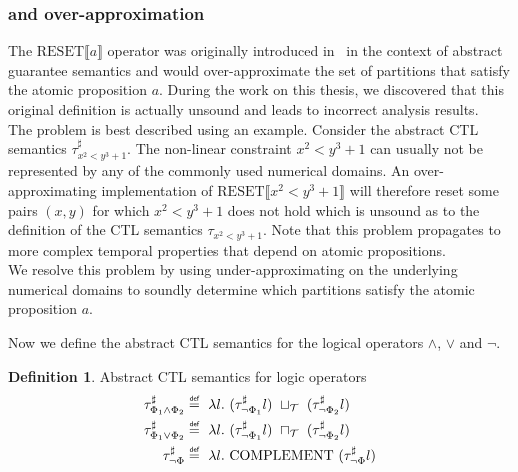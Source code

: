 \documentclass[11pt,a4paper,titlepage]{article}
\theoremstyle{definition}
\newtheorem{definition}{Definition}[section]
\newcommand\eqdef{\mathrel{\overset{\makebox[0pt]{\mbox{\normalfont\tiny\sffamily def}}}{=}}}
\begin{document}
\begin{tcolorbox}
    \subsubsection*{ and over-approximation}

    The $\text{RESET}\llbracket a \rrbracket$ operator was originally introduced in~\cite{UrbanPhd} in the context of abstract guarantee semantics
    and would over-approximate the set of partitions that satisfy the atomic proposition $a$. 
    During the work on this thesis, we discovered that this original definition is actually unsound and leads to incorrect analysis results.\\
    
    The problem is best described using an example. Consider the abstract CTL semantics $\tau^{\sharp}_{x^2 < y^3 + 1}$. 
    The non-linear constraint $x^2 < y^3 + 1$ can usually not be represented by any of the commonly used numerical domains. 
    An over-approximating implementation of $\text{RESET}\llbracket x^2 < y^3 + 1 \rrbracket$ will therefore
    reset some pairs $(x, y)$ for which $x^2 < y^3 + 1$ does not hold which is unsound as to the definition of
    the CTL semantics $\tau_{x^2 < y^3 + 1}$. Note that this problem propagates to more complex temporal properties that
    depend on atomic propositions.\\

    We resolve this problem by using under-approximating on the underlying numerical domains to soundly determine which partitions 
    satisfy the atomic proposition $a$. 
\end{tcolorbox}

Now we define the abstract CTL semantics for the logical operators $\land$, $\lor$ and $\neg$.

\begin{definition}\label{def:abstract_ctl_semantics_logic_operators}
    Abstract CTL semantics for logic operators
    \begin{align}
        \tau^{\sharp}_{\Phi_1 \land \Phi_2} &\eqdef \ \lambda l. \ (\tau^{\sharp}_{\neg \Phi_1}l) \ \sqcup_{\mathcal{T}} \ (\tau^{\sharp}_{\neg \Phi_2}l)
        \label{eq:abstract_ctl_and}\\
        \tau^{\sharp}_{\Phi_1 \lor \Phi_2} &\eqdef \ \lambda l. \ (\tau^{\sharp}_{\neg \Phi_1}l) \ \sqcap_{\mathcal{T}} \ (\tau^{\sharp}_{\neg \Phi_2}l)
        \label{eq:abstract_ctl_or}\\
        \tau^{\sharp}_{\neg \Phi} &\eqdef \ \lambda l. \ \text{COMPLEMENT} \ (\tau^{\sharp}_{\neg \Phi}l)
        \label{eq:abstract_ctl_not}
    \end{align}
\end{definition}
\end{document}
